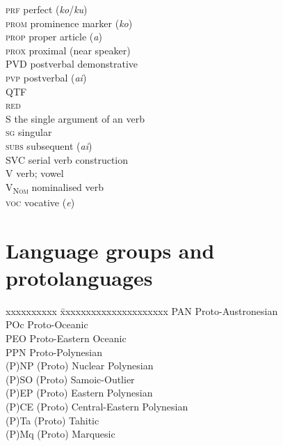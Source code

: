 \begin{tabbing}
{\scshape prf} \> perfect (\textit{ko}/\textit{ku})\\
{\scshape prom} \> prominence marker (\textit{ko})\\
{\scshape prop} \> {proper article (\textit{a})}\\
{\scshape prox} \> proximal (near speaker)\\
PVD  \> {postverbal demonstrative}\\
{\scshape pvp} \> postverbal  (\textit{ai})\\
QTF \> \\
{\scshape red} \> \\
S \> the single argument of an  verb\\
{\scshape sg} \> singular\\
{\scshape subs} \> subsequent (\textit{{\ꞌ}ai})\\
SVC \> serial verb construction\\
{\scshape V} \> verb; vowel\\
{\scshape V\textsubscript{Nom}} \> {nominalised verb}\\
{\scshape voc} \> {vocative (\textit{e})}\\
\end{tabbing} 
\section*{Language groups and protolanguages}

\begin{tabbing}
xxxxxxxxxx \= xxxxxxxxxxxxxxxxxxxxx \kill
PAN \> Proto-Austronesian\\
POc \> Proto-Oceanic\\
PEO \> Proto-Eastern Oceanic\\
PPN \> Proto-Polynesian\\
(P)NP \> (Proto) Nuclear Polynesian\\
(P)SO \> (Proto) Samoic-Outlier\\
(P)EP \> (Proto) Eastern Polynesian\\
(P)CE \> (Proto) Central-Eastern Polynesian\\
(P)Ta \> (Proto) Tahitic\\
(P)Mq \> (Proto) Marquesic\\
\end{tabbing}
